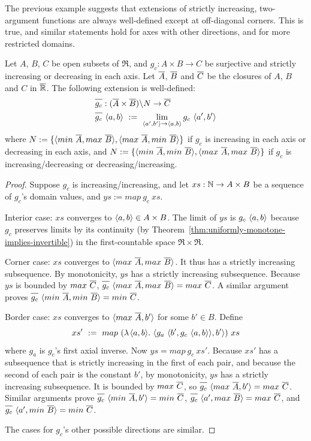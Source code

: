 The previous example suggests that extensions of strictly increasing, two-argument functions are always well-defined except at off-diagonal corners.
This is true, and similar statements hold for axes with other directions, and for more restricted domains.

\begin{theorem}
\label{thm:two-argument-extensions}
Let $A$, $B$, $C$ be open subsets of $\Re$, and $g_c : A \times B \to C$ be surjective and strictly increasing or decreasing in each axis.
Let $\cl{A}$, $\cl{B}$ and $\cl{C}$ be the closures of $A$, $B$ and $C$ in $\cl{\Re}$.
The following extension is well-defined:
\begin{equation}
\begin{aligned}
	&\cl{g_c} : (\cl{A} \times \cl{B}) \w N \to \cl{C} \\
	&\cl{g_c}~\pair{a,b}\ :=\ \lim_{\pair{a',b'} \to \pair{a,b}} g_c~\pair{a',b'}
\end{aligned}
\end{equation}
where $N := \set{\pair{min~\cl{A},max~\cl{B}},\pair{max~\cl{A},min~\cl{B}}}$ if $g_c$ is increasing in each axis or decreasing in each axis, and
$N := \set{\pair{min~\cl{A},min~\cl{B}},\pair{max~\cl{A},max~\cl{B}}}$ if $g_c$ is increasing/decreasing or decreasing/increasing.
\end{theorem}
\begin{proof}
Suppose $g_c$ is increasing/increasing, and let $xs : \mathbb{N} \to A \times B$ be a sequence of $g_c$'s domain values, and $ys := map~g_c~xs$.

Interior case: $xs$ converges to $\langle{a,b}\rangle \in A \times B$.
The limit of $ys$ is $g_c~\langle{a,b}\rangle$ because $g_c$ preserves limits by its continuity (by Theorem~\ref{thm:uniformly-monotone-implies-invertible}) in the first-countable space $\Re \times \Re$.

Corner case: $xs$ converges to $\pair{max~\cl{A},max~\cl{B}}$.
It thus has a strictly increasing subsequence.
By monotonicity, $ys$ has a strictly increasing subsequence.
Because $ys$ is bounded by $max~\cl{C}$, $\cl{g_c}~\pair{max~\cl{A},max~\cl{B}} = max~\cl{C}$.
A similar argument proves $\cl{g_c}~\pair{min~\cl{A},min~\cl{B}} = min~\cl{C}$.

Border case: $xs$ converges to $\pair{max~\cl{A},b'}$ for some $b' \in B$.
Define
\begin{equation}
	xs'\ :=\ map~(\fun{\pair{a,b}}\pair{g_a~\pair{b',g_c~\pair{a,b}},b'})~xs
\end{equation}
where $g_a$ is $g_c$'s first axial inverse.
Now $ys = map~g_c~xs'$.
Because $xs'$ has a subsequence that is strictly increasing in the first of each pair, and because the second of each pair is the constant $b'$, by monotonicity, $ys$ has a strictly increasing subsequence.
It is bounded by $max~\cl{C}$, so $\cl{g_c}~\pair{max~\cl{A},b'} = max~\cl{C}$.
Similar arguments prove $\cl{g_c}~\pair{min~\cl{A},b'} = min~\cl{C}$, $\cl{g_c}~\pair{a',max~\cl{B}} = max~\cl{C}$, and $\cl{g_c}~\pair{a',min~\cl{B}} = min~\cl{C}$.

The cases for $g_c$'s other possible directions are similar.
\end{proof}

